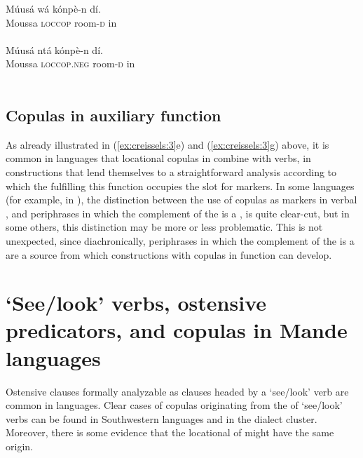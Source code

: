 \documentclass[output=paper]{langsci/langscibook}
\begin{document}
   \ex
    \gll   Múusá  wá  kónpè-n  dí. \\
      Moussa  \textsc{loccop}  room-\textsc{d}  in\\
      \\
   \ex
    \gll   Múusá  ntá  kónpè-n  dí. \\
      Moussa  \textsc{loccop}.\textsc{neg}  room-\textsc{d}  in\\
      \\
\z
\z


\subsection{Copulas in auxiliary function}\label{sec:creissels:3.4}

As already illustrated in (\ref{ex:creissels:3}e) and (\ref{ex:creissels:3}g) above, it is common in  languages that locational copulas in   combine with verbs, in constructions that lend themselves to a straightforward analysis according to which the  fulfilling this function occupies the slot for  markers. In some  languages (for example, in ), the distinction between the use of copulas as  markers in verbal , and periphrases in which the complement of the  is a , is quite clear-cut, but in some others, this distinction may be more or less problematic. This is not unexpected, since diachronically, periphrases in which the complement of the  is a  are a source from which constructions with copulas in  function can develop.

\section{‘See/look’ verbs, ostensive predicators, and copulas in Mande languages}\label{sec:creissels:4}

Ostensive clauses formally analyzable as  clauses headed by a ‘see\slash look’ verb are common in  languages. Clear cases of copulas originating from the  of ‘see\slash look’ verbs can be found in Southwestern  languages and in the  dialect cluster. Moreover, there is some evidence that the locational  of  might have the same origin.
\end{document}

